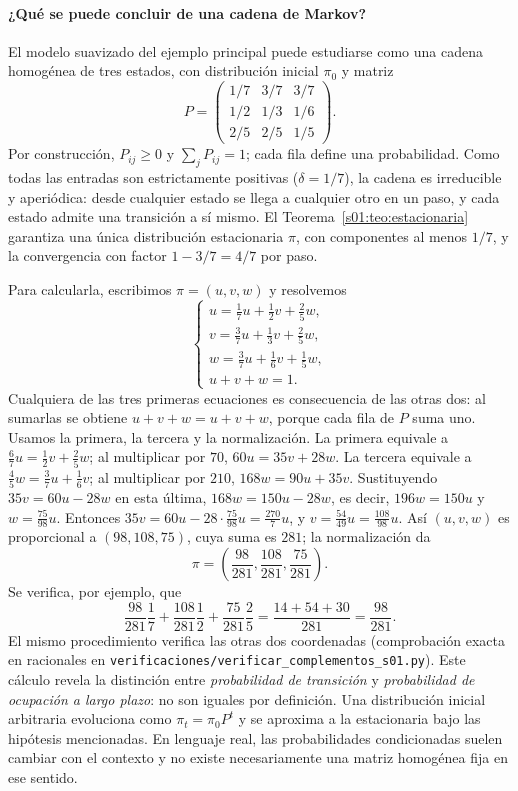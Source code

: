 \paragraph{¿Qué se puede concluir de una cadena de Markov?}
El modelo suavizado del ejemplo principal puede estudiarse como una cadena
homogénea de tres estados, con distribución inicial $\pi_0$ y matriz
\[
P=\begin{pmatrix}1/7&3/7&3/7\\1/2&1/3&1/6\\2/5&2/5&1/5\end{pmatrix}.
\]
Por construcción, $P_{ij}\ge0$ y $\sum_jP_{ij}=1$; cada fila define
una probabilidad. Como todas las entradas son estrictamente positivas
($\delta=1/7$), la cadena es irreducible y aperiódica: desde cualquier estado se
llega a cualquier otro en un paso, y cada estado admite una transición a sí mismo.
El Teorema~\ref{s01:teo:estacionaria} garantiza una única distribución
estacionaria $\pi$, con componentes al menos $1/7$, y la convergencia con factor
$1-3/7=4/7$ por paso.

Para calcularla, escribimos $\pi=(u,v,w)$ y resolvemos
\[
\begin{cases}
 u=\tfrac17u+\tfrac12v+\tfrac25w,\\
 v=\tfrac37u+\tfrac13v+\tfrac25w,\\
 w=\tfrac37u+\tfrac16v+\tfrac15w,\\
 u+v+w=1.
\end{cases}
\]
Cualquiera de las tres primeras ecuaciones es consecuencia de las otras dos: al
sumarlas se obtiene $u+v+w=u+v+w$, porque cada fila de $P$ suma uno. Usamos la
primera, la tercera y la normalización. La primera equivale a
$\frac67u=\frac12v+\frac25w$; al multiplicar por $70$, $60u=35v+28w$. La tercera
equivale a $\frac45w=\frac37u+\frac16v$; al multiplicar por $210$,
$168w=90u+35v$. Sustituyendo $35v=60u-28w$ en esta última, $168w=150u-28w$, es
decir, $196w=150u$ y $w=\frac{75}{98}u$. Entonces
$35v=60u-28\cdot\frac{75}{98}u=\frac{270}{7}u$, y $v=\frac{54}{49}u=\frac{108}{98}u$.
Así $(u,v,w)$ es proporcional a $(98,108,75)$, cuya suma es $281$; la
normalización da
\[
\boxed{\pi=\left(\frac{98}{281},\frac{108}{281},\frac{75}{281}\right).}
\]
Se verifica, por ejemplo, que
\[
\frac{98}{281}\frac17+\frac{108}{281}\frac12
+\frac{75}{281}\frac25
=\frac{14+54+30}{281}=\frac{98}{281}.
\]
El mismo procedimiento verifica las otras dos coordenadas (comprobación exacta en
racionales en \nolinkurl{verificaciones/verificar_complementos_s01.py}).
Este cálculo revela la distinción entre \emph{probabilidad de transición}
y \emph{probabilidad de ocupación a largo plazo}: no son iguales por
definición. Una distribución inicial arbitraria evoluciona como
$\pi_t=\pi_0P^t$ y se aproxima a la estacionaria bajo las hipótesis
mencionadas. En lenguaje real, las probabilidades condicionadas suelen
cambiar con el contexto y no existe necesariamente una matriz homogénea
fija en ese sentido.

